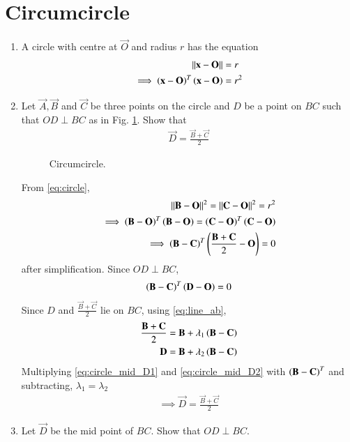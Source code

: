 \documentclass[journal,12pt,twocolumn]{IEEEtran}
\renewcommand\thesection{\arabic{section}}
\begin{document}
\section{Circumcircle}
\begin{enumerate}[label=\thesection.\arabic*
,ref=\thesection.\theenumi]
\item A circle with centre at  $\vec{O}$ and radius $r$ has the equation 
\begin{align}
\lVert\mathbf{x}-\mathbf{O}\rVert&=r
\\
\implies \left(\mathbf{x}-\mathbf{O}\right)^T\left(\mathbf{x}-\mathbf{O}\right) &= r^2
\label{eq:circle}
\end{align}
\item Let $\vec{A},\vec{B}$ and $\vec{C}$ be three points on the circle and 
$D$ be a point on $BC$ such that
$OD \perp BC$ as in Fig. \ref{fig:ccircle}.  Show that 
\begin{align}
\vec{D}=\frac{\vec{B}+\vec{C}}{2}
\end{align}
%
\begin{figure}[!ht]
	\begin{center}
		
		\resizebox{\columnwidth}{!}{}
	\end{center}
	\caption{Circumcircle.}
	\label{fig:ccircle}	
\end{figure}


\solution From \eqref{eq:circle},
\begin{align}
\lVert\mathbf{B}-\mathbf{O}\rVert^2=\lVert\mathbf{C}-\mathbf{O}\rVert^2=r^2
\\
 \implies \left(\mathbf{B}-\mathbf{O}\right)^T\left(\mathbf{B}-\mathbf{O}\right) = 
\left(\mathbf{C}-\mathbf{O}\right)^T\left(\mathbf{C}-\mathbf{O}\right) 
\\
 \implies \left(\mathbf{B}-\mathbf{C}\right)^T\left(\frac{\mathbf{B}+\mathbf{C}}{2} - 
\mathbf{O}\right)  = 0
\label{eq:circle_mid}
\end{align}
after simplification. Since $OD \perp BC$,
\begin{align}
\left(\mathbf{B}-\mathbf{C}\right)^T\left(\mathbf{D}-\mathbf{O}\right) = 0 
\label{eq:circle_D}
\end{align}
Since $D$ and $\frac{\vec{B}+\vec{C}}{2}$ lie on $BC$, using 
\eqref{eq:line_ab},
\begin{align}
\label{eq:circle_mid_D1}
\frac{\mathbf{B}+\mathbf{C}}{2}
&= \mathbf{B}+ \lambda_1\left(\mathbf{B}-\mathbf{C}\right)
\\
\mathbf{D}
&= \mathbf{B}+ \lambda_2\left(\mathbf{B}-\mathbf{C}\right)
\label{eq:circle_mid_D2}
\end{align}
Multiplying \eqref{eq:circle_mid_D1} and \eqref{eq:circle_mid_D2} with 
$\left(\mathbf{B}-\mathbf{C}\right)^T$ and subtracting, $\lambda_1=\lambda_2$
%
\begin{align}
\implies \vec{D} = \frac{\vec{B}+\vec{C}}{2}
\label{eq:circle_bisect}
\end{align}
%
\item Let  $\vec{D}$ be the mid point of $BC$.  Show that $OD \perp BC$.
%
\end{enumerate}
\end{document}
